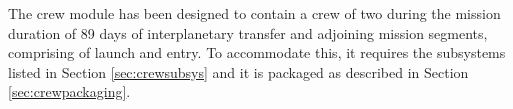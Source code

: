 The crew module has been designed to contain a crew of two during the mission duration of 89 days of interplanetary transfer and adjoining mission segments, comprising of launch and entry. To accommodate this, it requires the subsystems listed in Section \ref{sec:crewsubsys} and it is packaged as described in Section \ref{sec:crewpackaging}.
